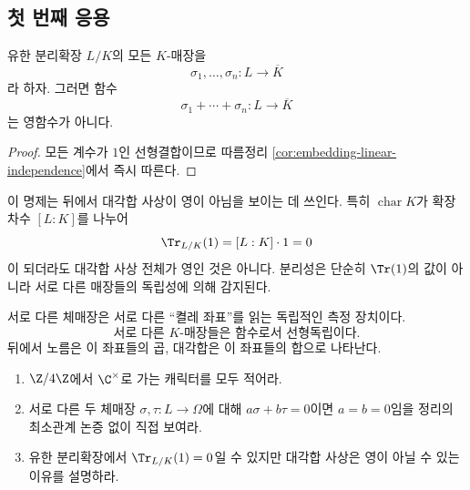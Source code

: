 \subsection{첫 번째 응용}

\begin{proposition}
\label{prop:sum-embeddings-nonzero}
유한 분리확장 $L/K$의 모든 $K$-매장을
\[
  \sigma_1,\dots,\sigma_n:L\longrightarrow\overline K
\]
라 하자. 그러면 함수
\[
  \sigma_1+\cdots+\sigma_n:L\longrightarrow\overline K
\]
는 영함수가 아니다.
\end{proposition}

\begin{proof}
모든 계수가 $1$인 선형결합이므로 따름정리 \ref{cor:embedding-linear-independence}에서 즉시 따른다.
\end{proof}

이 명제는 뒤에서 대각합 사상이 영이 아님을 보이는 데 쓰인다. 특히 $\operatorname{char}K$가 확장차수 $[L:K]$를 나누어
\[
  \Tr_{L/K}(1)=[L:K]\cdot1=0
\]
이 되더라도 대각합 사상 전체가 영인 것은 아니다. 분리성은 단순히 $\Tr(1)$의 값이 아니라 서로 다른 매장들의 독립성에 의해 감지된다.

\begin{keyidea}
서로 다른 체매장은 서로 다른 ``켤레 좌표''를 읽는 독립적인 측정 장치이다.
\[
  \boxed{
  \text{서로 다른 }K\text{-매장들은 함수로서 선형독립이다.}}
\]
뒤에서 노름은 이 좌표들의 곱, 대각합은 이 좌표들의 합으로 나타난다.
\end{keyidea}

\begin{checkpoint}
\begin{enumerate}[label=(\alph*)]
  \item $\Z/4\Z$에서 $\C^\times$로 가는 캐릭터를 모두 적어라.
  \item 서로 다른 두 체매장 $\sigma,\tau:L\to\Omega$에 대해 $a\sigma+b\tau=0$이면 $a=b=0$임을 정리의 최소관계 논증 없이 직접 보여라.
  \item 유한 분리확장에서 $\Tr_{L/K}(1)=0$일 수 있지만 대각합 사상은 영이 아닐 수 있는 이유를 설명하라.
\end{enumerate}
\end{checkpoint}
